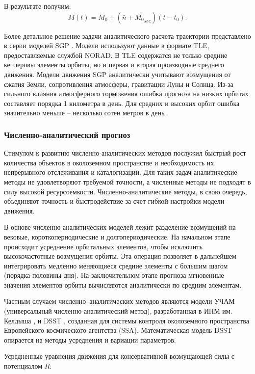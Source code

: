 В результате получим:
\begin{equation*}
    M(t) = M_0 + (\bar{n} + \dot{M_0}_{sec}) (t - t_0).
\end{equation*}

Более детальное решение задачи аналитического расчета траектории представлено в серии моделей SGP \cite{spacetrack80}.
Модели используют данные в формате TLE, предоставляемые службой NORAD. 
В TLE содержатся не только средние кеплеровы элементы орбиты, но и первая и вторая производные среднего движения.
Модели движения SGP аналитически учитывают возмущения от сжатия Земли, сопротивления атмосферы, гравитации Луны и Солнца.
Из-за сильного влияния атмосферного торможения ошибка прогноза на низких орбитах составляет порядка 1 километра в день.
Для средних и высоких орбит ошибка значительно меньше -- несколько сотен метров в день \cite{vallado2008}. 

\subsubsection{Численно-аналитический прогноз}
Стимулом к развитию численно-аналитических методов послужил быстрый рост количества
объектов в околоземном пространстве и необходимость их непрерывного отслеживания и каталогизации.
Для таких задач аналитические методы не удовлетворяют требуемой точности, а численные методы
не подходят в силу высокой ресурсоемкости. Численно-аналитические методы, в свою очередь,
объединяют точность и быстродействие за счет гибкой настройки модели движения.

В основе численно-аналитических моделей лежит разделение возмущений на вековые, 
короткопериодические и долгопериодические.
На начальном этапе происходит усреднение орбитальных элементов, 
чтобы исключить высокочастотные возмущения орбиты. Эта операция позволяет в дальнейшем
интегрировать медленно меняющиеся средние элементы с большим шагом (порядка половины дня).
На заключительном этапе прогноза мгновенные значения элементов орбиты вычисляются аналитически по средним элементам.

Частным случаем численно--аналитических методов являются модели УЧАМ (универсальный численно-аналитический метод),
разработанная в ИПМ им. Келдыша \cite{tulin2018}, и DSST \cite{danielson1995}, созданная для
системы контроля околоземного пространства Европейского космического агентства (SSA).
Математическая модель DSST опирается на методы усреднения и вариации параметров.

Усредненные уравнения движения для консервативной возмущающей силы с потенциалом $R$:

